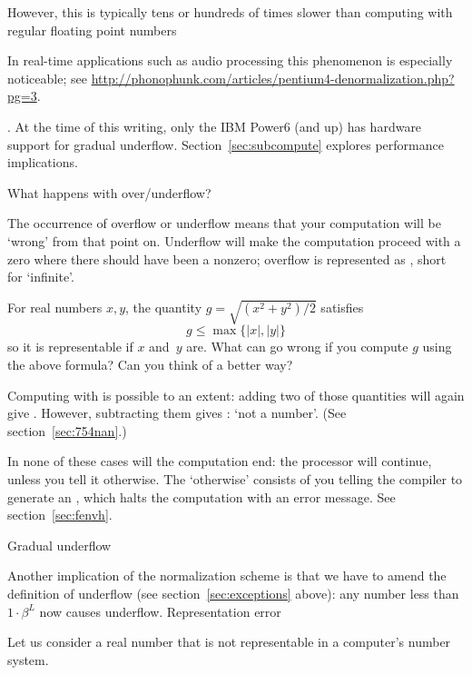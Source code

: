 However, this is typically tens or hundreds of times slower than
computing with regular floating point numbers
\begin{footnoteenv}
  {In real-time
applications such as audio processing this phenomenon is especially
noticeable;
see
\url{http://phonophunk.com/articles/pentium4-denormalization.php?pg=3}.}
\end{footnoteenv}
. 
At the time of this writing, only the IBM Power6 (and up) has
hardware support for gradual underflow.
Section~\ref{sec:subcompute} explores performance implications.

 {What happens with over/underflow?}

The occurrence of overflow or underflow means that your computation
will be `wrong' from that point on. Underflow will make the computation
proceed with a zero where there should have been a nonzero;
overflow is represented as , short for `infinite'.

\begin{exercise}
For real numbers $x,y$, the quantity $g=\sqrt{(x^2+y^2)/2}$ satisfies
\begin{equation}
  g\leq \max\{|x|,|y|\}
\end{equation}
so it is representable if $x$ and~$y$ are.
What can go wrong if you compute $g$ using the above formula?
Can you think of a better way?
\end{exercise}


Computing with  is possible to an extent: adding two of those
quantities will again give . However, subtracting them gives
: `not a number'.
(See section~\ref{sec:754nan}.)

In none of these cases will the computation end:
the processor will continue, unless you tell it otherwise.
The `otherwise' consists of you telling the compiler to generate an ,
which halts the computation with an error message. See section~\ref{sec:fenvh}.


 {Gradual underflow}
\label{sec:754underflow}

Another implication of the normalization scheme is that we have to amend the
definition of underflow (see section~\ref{sec:exceptions} above):
any number less than $1\cdot\beta^L$ now causes underflow.
%
 {Representation error}

Let us consider a real number that is not representable in a
computer's number system.

